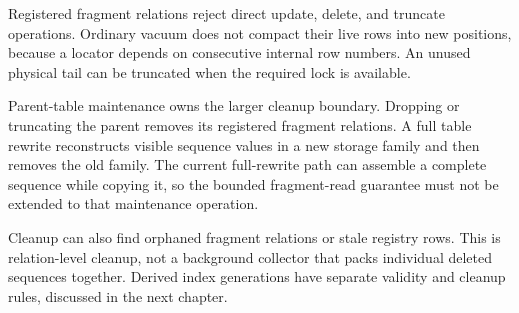 Registered fragment relations reject direct update, delete, and truncate
operations. Ordinary vacuum does not compact their live rows into new
positions, because a locator depends on consecutive internal row numbers.
An unused physical tail can be truncated when the required lock is available.

Parent-table maintenance owns the larger cleanup boundary. Dropping or
truncating the parent removes its registered fragment relations.
A full table rewrite reconstructs visible sequence
values in a new storage family and then removes the old family. The current
full-rewrite path can assemble a complete sequence while copying it, so the
bounded fragment-read guarantee must not be extended to that maintenance
operation.

Cleanup can also find orphaned fragment relations or stale registry rows.
This is relation-level cleanup, not a background collector that packs
individual deleted sequences together. Derived index generations have
separate validity and cleanup rules, discussed in the next chapter.
